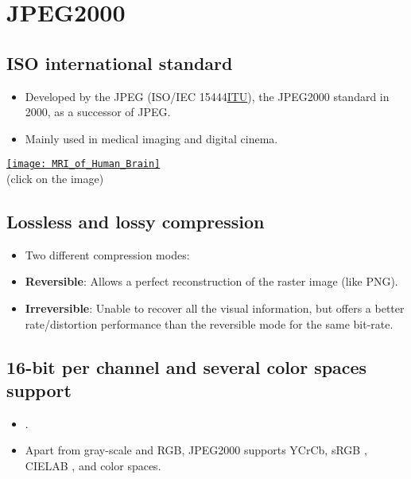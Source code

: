 \chapter{JPEG2000}

\section{\acrshort{ISO} international standard}
\begin{itemize}
\item Developed by the \gls{JPEG} (ISO/IEC 15444\href{https://www.itu.int}{ITU}),
  the JPEG2000 standard \cite{taubman2002jpeg2000} in 2000, as a successor of
  \gls{JPEG}.
\item Mainly used in medical imaging and digital cinema.
\end{itemize}
\vspace{-2ex}
\begin{center}
  \href{https://en.wikipedia.org/wiki/Magnetic_resonance_imaging_of_the_brain#/media/File:MRI_of_Human_Brain.jpg}{\texttt{[image: MRI\_of\_Human\_Brain]}}\\
  (click on the image)
\end{center}

\section{Lossless and lossy compression}
\begin{itemize}
\item Two different compression modes:
\item \textbf{Reversible}: Allows a perfect reconstruction of the raster image (like \gls{PNG}).
\item \textbf{Irreversible}: Unable to recover all the visual
  information, but offers a better rate/distortion performance than
  the reversible mode for the same bit-rate.
\end{itemize}

\section{16-bit per channel and several color spaces support}
\begin{itemize}
\item {}.
\item Apart from gray-scale and \gls{RGB}, JPEG2000 supports
  \gls{YCrCb}, \gls{sRGB} \cite{sRGB_wikipedia}, \gls{CIELAB}
  \cite{CIELAB_wikipedia}, and  \cite{houchin2001specification} color spaces.
\end{itemize}

